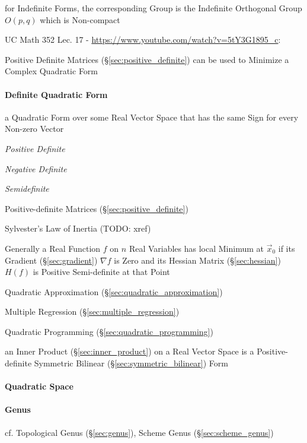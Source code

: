 for Indefinite Forms, the corresponding Group is the Indefinite Orthogonal
Group $O(p,q)$ which is Non-compact


UC Math 352 Lec. 17 - \url{https://www.youtube.com/watch?v=5tY3G1895_c}:

Positive Definite Matrices (\S\ref{sec:positive_definite}) can be used to
Minimize a Complex Quadratic Form



\paragraph{Definite Quadratic Form}\label{sec:definite_quadratic}\hfill

a Quadratic Form over some Real Vector Space that has the same Sign
for every Non-zero Vector

\emph{Positive Definite}

\emph{Negative Definite}

\emph{Semidefinite}

\fist Positive-definite Matrices (\S\ref{sec:positive_definite})

\fist Sylvester's Law of Inertia (TODO: xref)

Generally a Real Function $f$ on $n$ Real Variables has local Minimum at
$\vec{x}_0$ if its Gradient (\S\ref{sec:gradient}) $\nabla f$ is Zero and its
Hessian Matrix (\S\ref{sec:hessian}) $H(f)$ is Positive Semi-definite at
that Point

\fist Quadratic Approximation (\S\ref{sec:quadratic_approximation})

\fist Multiple Regression (\S\ref{sec:multiple_regression})

\fist Quadratic Programming (\S\ref{sec:quadratic_programming})

an Inner Product (\S\ref{sec:inner_product}) on a Real Vector Space is
a Positive-definite Symmetric Bilinear
(\S\ref{sec:symmetric_bilinear}) Form



\paragraph{Quadratic Space}\label{sec:quadratic_space}\hfill

\paragraph{Genus}\label{sec:quadratic_genus}\hfill

\fist cf. Topological Genus (\S\ref{sec:genus}), Scheme Genus
(\S\ref{sec:scheme_genus})



